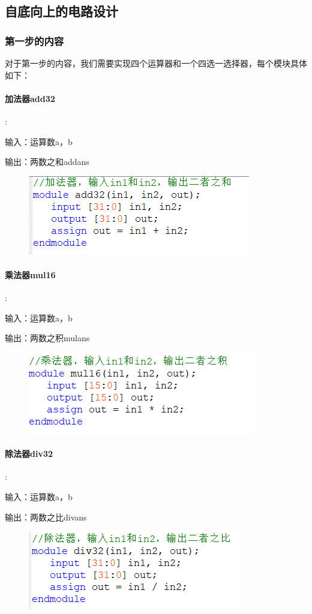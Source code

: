 \documentclass[UTF8]{ctexart}
\begin{document}
\subsection{自底向上的电路设计}
\subsubsection{第一步的内容}

对于第一步的内容，我们需要实现四个运算器和一个四选一选择器，每个模块具体如下：\\
\paragraph{加法器add32}:\par
输入：运算数a，b\par
输出：两数之和addans
\begin{figure}[H]\begin{center}
    \includegraphics[scale=1]{add32.PNG}
\end{center}\end{figure}
\paragraph{乘法器mul16}:\par
输入：运算数a，b\par
输出：两数之积mulans
\begin{figure}[H]\begin{center}
    \includegraphics[scale=1]{mul16.PNG}
\end{center}\end{figure}
\paragraph{除法器div32}:\par
输入：运算数a，b\par
输出：两数之比divans
\begin{figure}[H]\begin{center}
    \includegraphics[scale=1]{div32.PNG}
\end{center}\end{figure}
\end{document}
